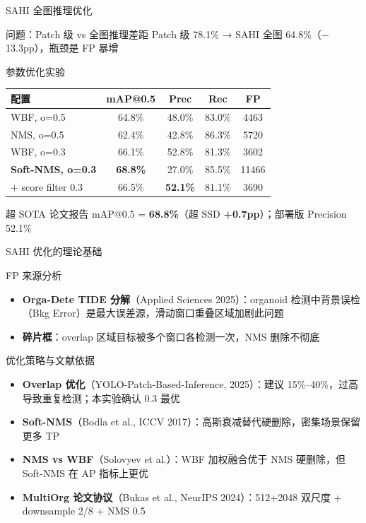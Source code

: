 \documentclass[aspectratio=169, 10pt]{beamer}
\begin{document}
\begin{frame}{SAHI 全图推理优化}
  \begin{block}{问题：Patch 级 vs 全图推理差距}
    Patch 级 78.1\% → SAHI 全图 64.8\%（$-$13.3pp），瓶颈是 \alert{FP 暴增}
  \end{block}
  \vspace{0em}
  \begin{block}{参数优化实验}
    \begin{tabular}{lcccc}
      \toprule
      配置 & mAP@0.5 & Prec & Rec & FP \\
      \midrule
      WBF, o=0.5 & 64.8\% & 48.0\% & 83.0\% & 4463 \\
      NMS, o=0.5 & 62.4\% & 42.8\% & 86.3\% & 5720 \\
      WBF, o=0.3 & 66.1\% & 52.8\% & 81.3\% & 3602 \\
      \textbf{Soft-NMS, o=0.3} & \textbf{68.8\%} & 27.0\% & 85.5\% & 11466 \\
      \midrule
      + score filter 0.3 & 66.5\% & \textbf{52.1\%} & 81.1\% & 3690 \\
      \bottomrule
    \end{tabular}
  \end{block}
  \vspace{0em}
  \begin{alertblock}{超 SOTA}
    论文报告 mAP@0.5 = \textbf{68.8\%}（超 SSD \textbf{+0.7pp}）；部署版 Precision 52.1\%
  \end{alertblock}
\end{frame}

\begin{frame}{SAHI 优化的理论基础}
  \begin{block}{FP 来源分析}
    \begin{itemize}
      \item \textbf{Orga-Dete TIDE 分解}（Applied Sciences 2025）：organoid 检测中背景误检（Bkg Error）是最大误差源，滑动窗口重叠区域加剧此问题
      \item \textbf{碎片框}：overlap 区域目标被多个窗口各检测一次，NMS 删除不彻底
    \end{itemize}
  \end{block}
  \vspace{0em}
  \begin{block}{优化策略与文献依据}
    \begin{itemize}
      \item \textbf{Overlap 优化}（YOLO-Patch-Based-Inference, 2025）：建议 15\%--40\%，过高导致重复检测；本实验确认 0.3 最优
      \item \textbf{Soft-NMS}（Bodla et al., ICCV 2017）：高斯衰减替代硬删除，密集场景保留更多 TP
      \item \textbf{NMS vs WBF}（Solovyev et al.）：WBF 加权融合优于 NMS 硬删除，但 Soft-NMS 在 AP 指标上更优
      \item \textbf{MultiOrg 论文协议}（Bukas et al., NeurIPS 2024）：512+2048 双尺度 + downsample 2/8 + NMS 0.5
    \end{itemize}
  \end{block}
\end{frame}
\end{document}

